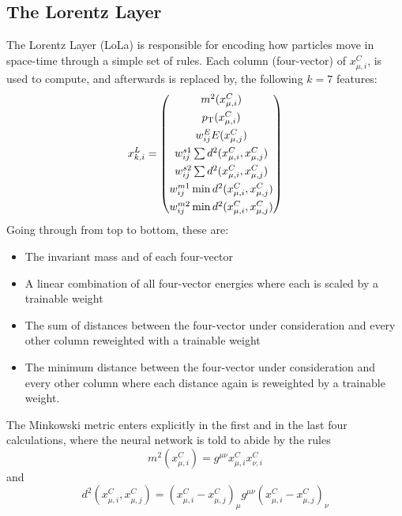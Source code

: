 \subsection{The Lorentz Layer}
The Lorentz Layer (LoLa) is responsible for encoding how particles move in space-time through a simple set of rules. Each column (four-vector) of $x_{\mu,i}^{C}$, is used to compute, and afterwards is replaced by, the following $k=7$ features:
\begin{equation}
  \label{eq:lola:lola}
  x_{k,i}^{L} = \begin{pmatrix}
  m^2  (x_{\mu,i}^{C})                       \\[1ex]
  p_{\mathrm{T}}  (x_{\mu,i}^{C})                       \\[1ex]
  w^E_{ij} E(x_{\mu,j}^{C})                       \\[1ex]
  w^{s1}_{ij}\sum d^2(x_{\mu,i}^{C},x_{\mu,j}^{C}) \\[1ex]
  w^{s2}_{ij}\sum d^2(x_{\mu,i}^{C},x_{\mu,j}^{C}) \\[1ex]
  w^{m1}_{ij}\min d^2(x_{\mu,i}^{C},x_{\mu,j}^{C}) \\[1ex]
  w^{m2}_{ij}\min d^2(x_{\mu,i}^{C},x_{\mu,j}^{C}) 
  \end{pmatrix}
\end{equation}
Going through from top to bottom, these are:
\begin{itemize}
  \item The invariant mass and \PT of each four-vector
  \item A linear combination of all four-vector energies where each is scaled by a trainable weight
  \item The sum of distances between the four-vector under consideration and every other column reweighted with a trainable weight
  \item The minimum distance between the four-vector under consideration and every other column where each distance again is reweighted by a trainable weight.
 \end{itemize}
  The Minkowski metric enters explicitly in the first and in the last four calculations, where the neural network is told to abide by the rules
\begin{equation}
  m^2 (x_{\mu,i}^{C}) = g^{\mu\nu}x_{\mu,i}^{C}x_{\nu,i}^{C}
\end{equation}
and
\begin{equation}
  d^2 (x_{\mu,i}^{C},x_{\mu,j}^{C}) = (x_{\mu,i}^{C}-x_{\mu,j}^{C})_{\mu} g^{\mu\nu} (x_{\mu,i}^{C}-x_{\mu,j}^{C})_{\nu}
\end{equation}
